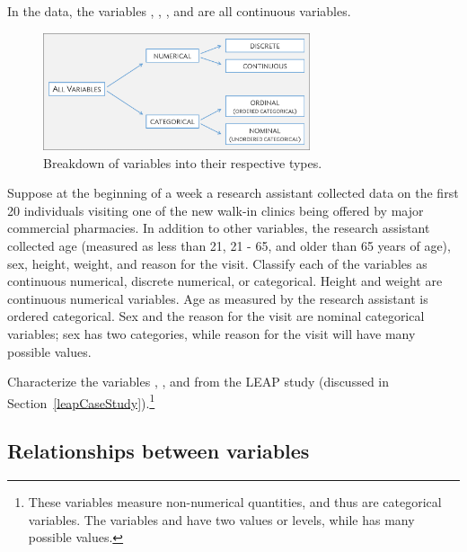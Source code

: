In the  data, the variables , , , and  are all continuous variables. 

\begin{figure}
\centering
\includegraphics[width=0.70\textwidth]{ch_intro_to_data_oi_biostat/figures/variables/variableTypes.png}
\caption{Breakdown of variables into their respective types.}
\label{variableTypes}
\end{figure}

\begin{example}{Suppose at the beginning of a week a research assistant collected data on the first 20 individuals visiting one of the new walk-in clinics being offered by major commercial pharmacies.  In addition to other variables, the research assistant collected age (measured as less than 21, 21 - 65, and older than 65 years of age), sex, height, weight, and reason for the visit.  Classify each of the variables as continuous numerical, discrete numerical, or categorical.}
Height and weight are continuous numerical variables. Age as measured by the research assistant is ordered categorical. Sex and the reason for the visit are nominal categorical variables; sex has two categories, while reason for the visit will have many possible values. 
\end{example}


\begin{exercise} 
Characterize the variables , , and  from the LEAP study (discussed in Section~\ref{leapCaseStudy}).\footnote{These variables measure non-numerical quantities, and thus are categorical variables. The variables   and  have two values or levels, while  has many possible values.}
\end{exercise}

\subsection{Relationships between variables}
\label{variableRelations}

